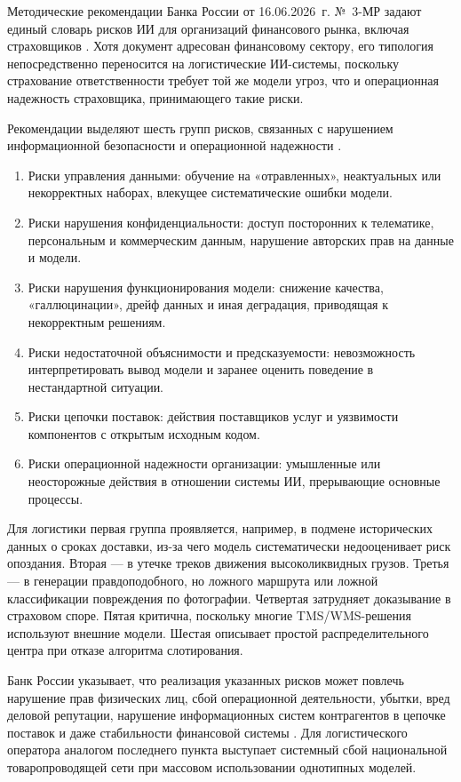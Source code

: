 \documentclass[a4paper,14pt]{extarticle}
\begin{document}
Методические рекомендации Банка России от 16.06.2026~г. №~3-МР задают единый словарь рисков ИИ для организаций финансового рынка, включая страховщиков \cite{cbr}. Хотя документ адресован финансовому сектору, его типология непосредственно переносится на логистические ИИ-системы, поскольку страхование ответственности требует той же модели угроз, что и операционная надежность страховщика, принимающего такие риски.

Рекомендации выделяют шесть групп рисков, связанных с нарушением информационной безопасности и операционной надежности \cite{cbr}.

\begin{enumerate}
\item Риски управления данными: обучение на «отравленных», неактуальных или некорректных наборах, влекущее систематические ошибки модели.
\item Риски нарушения конфиденциальности: доступ посторонних к телематике, персональным и коммерческим данным, нарушение авторских прав на данные и модели.
\item Риски нарушения функционирования модели: снижение качества, «галлюцинации», дрейф данных и иная деградация, приводящая к некорректным решениям.
\item Риски недостаточной объяснимости и предсказуемости: невозможность интерпретировать вывод модели и заранее оценить поведение в нестандартной ситуации.
\item Риски цепочки поставок: действия поставщиков услуг и уязвимости компонентов с открытым исходным кодом.
\item Риски операционной надежности организации: умышленные или неосторожные действия в отношении системы ИИ, прерывающие основные процессы.
\end{enumerate}

Для логистики первая группа проявляется, например, в подмене исторических данных о сроках доставки, из-за чего модель систематически недооценивает риск опоздания. Вторая --- в утечке треков движения высоколиквидных грузов. Третья --- в генерации правдоподобного, но ложного маршрута или ложной классификации повреждения по фотографии. Четвертая затрудняет доказывание в страховом споре. Пятая критична, поскольку многие TMS/WMS-решения используют внешние модели. Шестая описывает простой распределительного центра при отказе алгоритма слотирования.

Банк России указывает, что реализация указанных рисков может повлечь нарушение прав физических лиц, сбой операционной деятельности, убытки, вред деловой репутации, нарушение информационных систем контрагентов в цепочке поставок и даже стабильности финансовой системы \cite{cbr}. Для логистического оператора аналогом последнего пункта выступает системный сбой национальной товаропроводящей сети при массовом использовании однотипных моделей.
\end{document}
